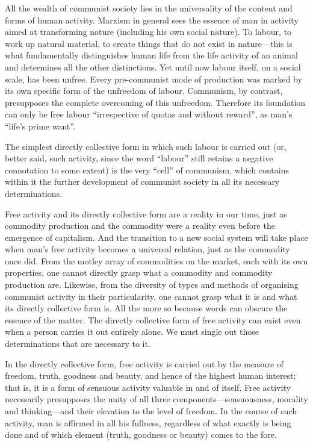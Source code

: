 \documentclass[12pt,a4paper,openany]{book}
\begin{document}
All the wealth of communist society lies in the universality of the content and forms of human activity. Marxism in general sees the essence of man in activity aimed at transforming nature (including his own social nature). To labour, to work up natural material, to create things that do not exist in nature—this is what fundamentally distinguishes human life from the life activity of an animal and determines all the other distinctions. Yet until now labour itself, on a social scale, has been unfree. Every pre-communist mode of production was marked by its own specific form of the unfreedom of labour. Communism, by contrast, presupposes the complete overcoming of this unfreedom. Therefore its foundation can only be free labour “irrespective of quotas and without reward”, as man’s “life’s prime want”.

The simplest directly collective form in which such labour is carried out (or, better said, such activity, since the word “labour” still retains a negative connotation to some extent) is the very “cell” of communism, which contains within it the further development of communist society in all its necessary determinations.

Free activity and its directly collective form are a reality in our time, just as commodity production and the commodity were a reality even before the emergence of capitalism. And the transition to a new social system will take place when man’s free activity becomes a universal relation, just as the commodity once did. From the motley array of commodities on the market, each with its own properties, one cannot directly grasp what a commodity and commodity production are. Likewise, from the diversity of types and methods of organising communist activity in their particularity, one cannot grasp what it is and what its directly collective form is. All the more so because words can obscure the essence of the matter. The directly collective form of free activity can exist even when a person carries it out entirely alone. We must single out those determinations that are necessary to it.

In the directly collective form, free activity is carried out by the measure of freedom, truth, goodness and beauty, and hence of the highest human interest; that is, it is a form of sensuous activity valuable in and of itself. Free activity necessarily presupposes the unity of all three components—sensuousness, morality and thinking—and their elevation to the level of freedom. In the course of such activity, man is affirmed in all his fullness, regardless of what exactly is being done and of which element (truth, goodness or beauty) comes to the fore.
\end{document}
